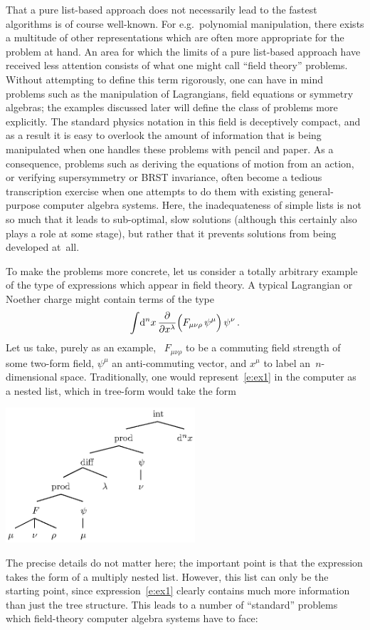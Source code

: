 \documentclass{elsart}
\begin{document}
That a pure list-based approach does not necessarily lead to the
fastest algorithms is of course well-known. For e.g.~polynomial
manipulation, there exists a multitude of other representations which
are often more appropriate for the problem at hand. An area for which
the limits of a pure list-based approach have received less attention
consists of what one might call ``field theory'' problems.  Without
attempting to define this term rigorously, one can have in mind
problems such as the manipulation of Lagrangians, field equations or
symmetry algebras; the examples discussed later will define the class
of problems more explicitly. The standard physics notation in this
field is deceptively compact, and as a result it is easy to overlook
the amount of information that is being manipulated when one handles
these problems with pencil and paper. As a consequence, problems such
as deriving the equations of motion from an action, or verifying
supersymmetry or BRST invariance, often become a tedious transcription
exercise when one attempts to do them with existing general-purpose
computer algebra systems. Here, the inadequateness of simple lists is
not so much that it leads to sub-optimal, slow solutions (although
this certainly also plays a role at some stage), but rather that it
prevents solutions from being developed at~all.

To make the problems more concrete, let us consider a totally
arbitrary example of the type of expressions which appear in field
theory.  A typical Lagrangian or Noether charge might contain terms of
the type
\begin{equation}
\label{e:ex1}
\int\!{\rm d}^nx\, \frac{\partial}{\partial x^\lambda} \Big(F_{\mu\nu\rho}\, \psi^{\mu} \Big)\, \psi^{\nu}\,.
\end{equation}
Let us take, purely as an example, ~$F_{\mu\nu\rho}$ to be a
commuting field strength of some two-form field, $\psi^\mu$ an
anti-commuting vector, and $x^\mu$ to label an~$n$-dimensional space.
Traditionally, one would represent~\eqref{e:ex1} in the computer as a
nested list, which in tree-form would take the form\vspace{2ex}
\begin{center}
\includegraphics[height=5cm]{exp2.eps}\\[2ex]
\end{center}
The precise details do not matter here; the important point is that
the expression takes the form of a multiply nested list. However, this
list can only be the starting point, since expression~\eqref{e:ex1} clearly
contains much more information than just the tree structure. This
leads to a number of ``standard'' problems which field-theory computer
algebra systems have to face: \medskip
\end{document}
